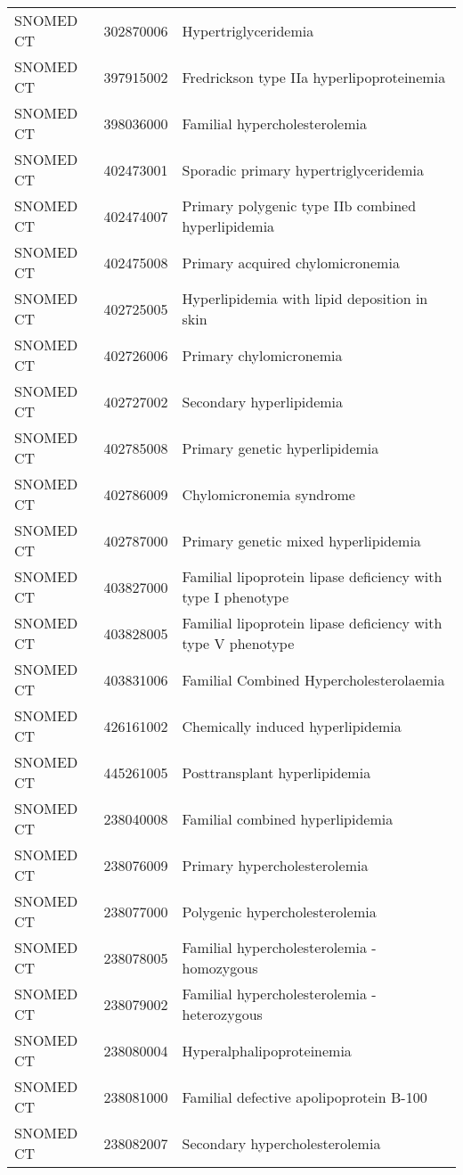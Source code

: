 \begin{longtable}{p{}p{}p{}}
  SNOMED CT & 302870006 & Hypertriglyceridemia \\ 
  SNOMED CT & 397915002 & Fredrickson type IIa hyperlipoproteinemia \\ 
  SNOMED CT & 398036000 & Familial hypercholesterolemia \\ 
  SNOMED CT & 402473001 & Sporadic primary hypertriglyceridemia \\ 
  SNOMED CT & 402474007 & Primary polygenic type IIb combined hyperlipidemia \\ 
  SNOMED CT & 402475008 & Primary acquired chylomicronemia \\ 
  SNOMED CT & 402725005 & Hyperlipidemia with lipid deposition in skin \\ 
  SNOMED CT & 402726006 & Primary chylomicronemia \\ 
  SNOMED CT & 402727002 & Secondary hyperlipidemia \\ 
  SNOMED CT & 402785008 & Primary genetic hyperlipidemia \\ 
  SNOMED CT & 402786009 & Chylomicronemia syndrome \\ 
  SNOMED CT & 402787000 & Primary genetic mixed hyperlipidemia \\ 
  SNOMED CT & 403827000 & Familial lipoprotein lipase deficiency with type I phenotype \\ 
  SNOMED CT & 403828005 & Familial lipoprotein lipase deficiency with type V phenotype \\ 
  SNOMED CT & 403831006 & Familial Combined Hypercholesterolaemia \\ 
  SNOMED CT & 426161002 & Chemically induced hyperlipidemia \\ 
  SNOMED CT & 445261005 & Posttransplant hyperlipidemia \\ 
  SNOMED CT & 238040008 & Familial combined hyperlipidemia \\ 
  SNOMED CT & 238076009 & Primary hypercholesterolemia \\ 
  SNOMED CT & 238077000 & Polygenic hypercholesterolemia \\ 
  SNOMED CT & 238078005 & Familial hypercholesterolemia - homozygous \\ 
  SNOMED CT & 238079002 & Familial hypercholesterolemia - heterozygous \\ 
  SNOMED CT & 238080004 & Hyperalphalipoproteinemia \\ 
  SNOMED CT & 238081000 & Familial defective apolipoprotein B-100 \\ 
  SNOMED CT & 238082007 & Secondary hypercholesterolemia \\ 

\end{longtable}
